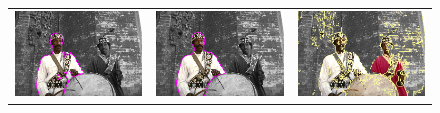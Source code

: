 \documentclass[runningheads]{llncs}
\begin{document}
\begin{figure}
\begin{tabular}{ccc}
		\includegraphics[scale=0.2]{images/segmentation/man/gc-seg.png} &
		\includegraphics[scale=0.2]{images/segmentation/man/corrected-seg.png} &
		\includegraphics[scale=0.2]{images/segmentation/schoenemann/man/man-seg.png}\\		

\end{tabular}
\end{figure}
\end{document}
